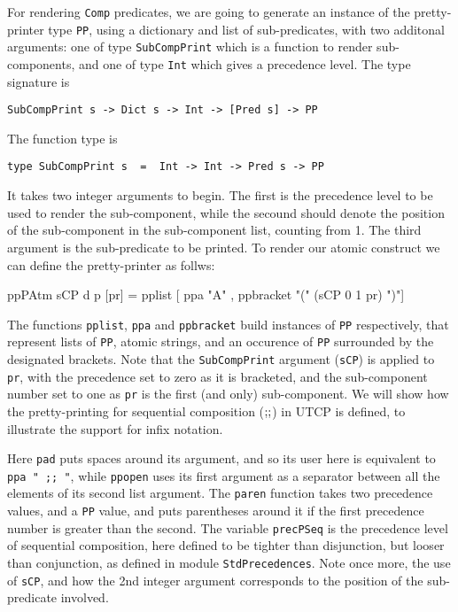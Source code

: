 For rendering \texttt{Comp} predicates, 
we are going to generate an instance
of the pretty-printer type \texttt{PP}, using a dictionary
and list of sub-predicates,
with two additonal arguments:
one of type \texttt{SubCompPrint} which 
is a function to render sub-components,
and one of type \texttt{Int} which gives a precedence level.
The type signature is
\begin{verbatim}
SubCompPrint s -> Dict s -> Int -> [Pred s] -> PP
\end{verbatim}
The function type is
\begin{verbatim}
type SubCompPrint s  =  Int -> Int -> Pred s -> PP
\end{verbatim}
It takes two integer arguments to begin.
The first is the precedence level to be used to render the
sub-component,
while the secound should denote the position of the sub-component
in the sub-component list, counting from 1.
The third argument is the sub-predicate to be printed.
To render our atomic construct we can define the pretty-printer
as follws:
\begin{code}
ppPAtm sCP d p [pr]
       = pplist [ ppa "A" , ppbracket "(" (sCP 0 1 pr) ")"]
\end{code}
The functions \texttt{pplist}, \texttt{ppa} and \texttt{ppbracket}
build instances of \texttt{PP} respectively,
that represent lists of \texttt{PP},
atomic strings,
and an occurence of \texttt{PP} surrounded by the designated brackets.
Note that the \texttt{SubCompPrint} argument (\texttt{sCP})
is applied to \texttt{pr},
with the precedence set to zero as it is bracketed,
and the sub-component number set to one as \texttt{pr} is the first
(and only) sub-component.
We will show how the pretty-printing for
sequential composition ($\mathrel{\mathbf{;\!;}}$) in UTCP is defined,
to illustrate the support for infix notation.
Here \texttt{pad} puts spaces around its argument,
and so its user here is equivalent to \verb$ppa " ;; "$,
while \texttt{ppopen} uses its first argument as a
separator between all the elements of its second list argument.
The \texttt{paren} function takes two precedence values,
and a \texttt{PP} value, and puts parentheses around it if the first precedence
number is greater than the second.
The variable \texttt{precPSeq} is the precedence level of sequential composition,
here defined to be tighter than disjunction,
but looser than conjunction, as defined in module \texttt{StdPrecedences}.
Note once more, the use of \texttt{sCP}, and how the 2nd integer argument
corresponds to the position of the sub-predicate involved.

